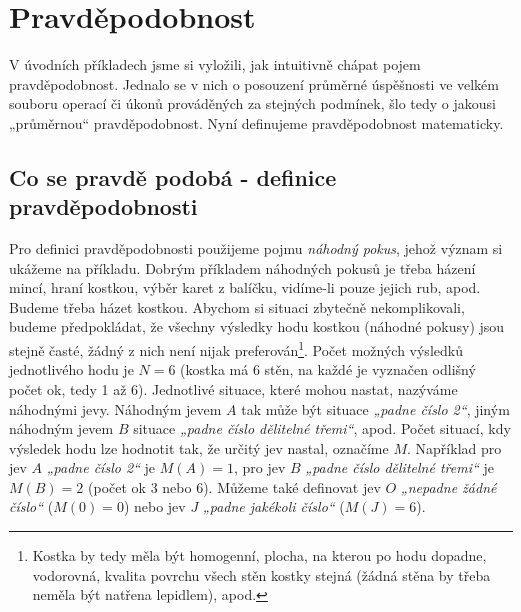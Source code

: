   \section{Pravděpodobnost}\label{mai:IchapIIIsecI}
    V úvodních příkladech jsme si vyložili, jak intuitivně chápat pojem pravděpodobnost. Jednalo se 
    v nich o posouzení průměrné úspěšnosti ve velkém souboru operací či úkonů prováděných za 
    stejných podmínek, šlo tedy o jakousi „průměrnou“ pravděpodobnost. Nyní definujeme 
    pravděpodobnost matematicky.
    
    \subsection{Co se pravdě podobá - definice pravděpodobnosti}
      Pro definici pravděpodobnosti použijeme pojmu \emph{náhodný pokus}, jehož význam si ukážeme 
      na příkladu. Dobrým příkladem náhodných pokusů je třeba házení mincí, hraní kostkou, výběr 
      karet z balíčku, vidíme-li pouze jejich rub, apod. Budeme třeba házet kostkou. Abychom si 
      situaci zbytečně nekomplikovali, budeme předpokládat, že všechny výsledky hodu kostkou 
      (náhodné pokusy) jsou stejně časté, žádný z nich není nijak preferován\footnote{Kostka by 
      tedy měla být homogenní, plocha, na kterou po hodu dopadne, vodorovná, kvalita povrchu všech 
      stěn kostky stejná (žádná stěna by třeba neměla být natřena lepidlem), apod.}. Počet možných 
      výsledků jednotlivého hodu je \(N = 6\) (kostka má \num{6} stěn, na každé je vyznačen odlišný 
      počet ok, tedy \num{1} až \num{6}). Jednotlivé situace, které mohou nastat, nazýváme 
      náhodnými jevy. Náhodným jevem \(A\) tak může být situace \emph{„padne číslo \num{2}“}, jiným 
      náhodným jevem \(B\) situace \emph{„padne číslo dělitelné třemi“}, apod. Počet situací, kdy 
      výsledek hodu lze hodnotit tak, že určitý jev nastal, označíme \(M\). Například pro jev \(A\) 
      \emph{„padne číslo \num{2}“} je \(M(A)= 1\), pro jev \(B\) \emph{„padne číslo dělitelné 
      třemi“} je \(M(B) = 2\) (počet ok \num{3} nebo \num{6}). Můžeme také definovat jev \(O\) 
      \emph{„nepadne žádné číslo“} (\(M(0) = 0\)) nebo jev \(J\) \emph{„padne jakékoli číslo“} 
      (\(M(J) = 6\)).
      
